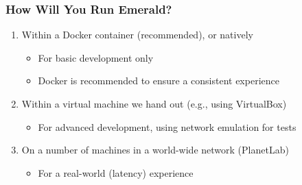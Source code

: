 \begin{frame}

\frametitle{How Will You Run Emerald?}

\begin{enumerate}

\item Within a Docker container (recommended), or natively

\begin{itemize}

\footnotesize

\item For basic development only

\item Docker is recommended to ensure a consistent experience

\end{itemize}

\item Within a virtual machine we hand out (e.g., using VirtualBox)

\begin{itemize}

\footnotesize

\item For advanced development, using network emulation for tests

\end{itemize}

\item On a number of machines in a world-wide network (PlanetLab)

\begin{itemize}

\footnotesize

\item For a real-world (latency) experience

\end{itemize}

\end{enumerate}

\end{frame}
